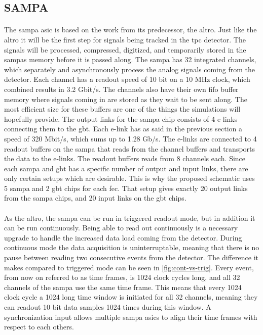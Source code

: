 \documentclass[a4paper, 12pt]{report}
\begin{document}
\subsection{SAMPA}
\label{subsec:sampa}
\paragraph{}
The \gls{sampa} \gls{asic} is based on the work from its predecessor, the \gls{altro}.
Just like the \gls{altro} it will be the first step for signals being tracked in the \gls{tpc} detector.
The signals will be processed, compressed, digitized, and temporarily stored in the \glspl{sampa} memory before it is passed along.
The \gls{sampa} has 32 integrated channels, which separately and asynchronously process the analog signals coming from the detector\cite{tdr-016}.
Each channel has a readout speed of 10 bit on a 10 MHz clock, which combined results in 3.2 Gbit/s.
The channels also have their own \gls{fifo} buffer memory where signals coming in are stored as they wait to be sent along.
The most efficient size for these buffers are one of the things the simulations will hopefully provide.
The output links for the \gls{sampa} chip consists of 4 e-links connecting them to the \gls{gbt}.
Each e-link has as said in the previous section a speed of 320 Mbit/s, which sums up to 1.28 Gb/s\cite{tdr-015}.
The e-links are connected to 4 readout buffers on the \gls{sampa} that reads from the channel buffers and transports the data to the e-links.
The readout buffers reads from 8 channels each.
Since each \gls{sampa} and \gls{gbt} has a specific number of output and input links, there are only certain setups which are desirable.
This is why the proposed schematic uses 5 \gls{sampa} and 2 \gls{gbt} chips for each \gls{fec}.
That setup gives exactly 20 output links from the \gls{sampa} chips, and 20 input links on the \gls{gbt} chips.

\paragraph{}
As the \gls{altro}, the \gls{sampa} can be run in triggered readout mode, but in addition it can be run continuously.
Being able to read out continuously is a necessary upgrade to handle the increased data load coming from the detector.
During continuous mode the data acquisition is uninterruptable, meaning that there is no pause between reading two consecutive events from the detector.
The difference it makes compared to triggered mode can be seen in \ref{fig:cont-vs-trig}.
Every event, from now on referred to as time frames, is 1024 clock cycles long, and all 32 channels of the \gls{sampa} use the same time frame.
This means that every 1024 clock cycle a 1024 long time window is initiated for all 32 channels, meaning they can readout 10 bit data samples 1024 times during this window.
A synchronization input allows multiple \gls{sampa} \gls{asic}s to align their time frames with respect to each others.\cite{tdr-015}
\end{document}
